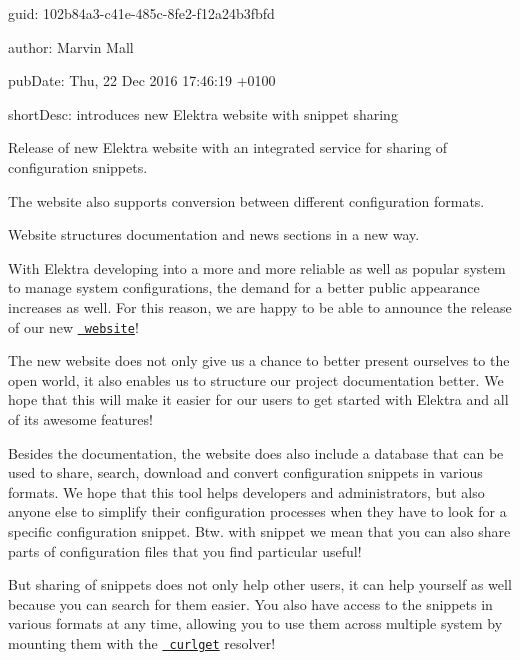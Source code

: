 
\begin{DoxyItemize}
\item guid\+: 102b84a3-\/c41e-\/485c-\/8fe2-\/f12a24b3fbfd
\item author\+: Marvin Mall
\item pub\+Date\+: Thu, 22 Dec 2016 17\+:46\+:19 +0100
\item short\+Desc\+: introduces new Elektra website with snippet sharing
\end{DoxyItemize}


\begin{DoxyEnumerate}
\item Release of new Elektra website with an integrated service for sharing of configuration snippets.
\item The website also supports conversion between different configuration formats.
\item Website structures documentation and news sections in a new way.
\end{DoxyEnumerate}

With Elektra developing into a more and more reliable as well as popular system to manage system configurations, the demand for a better public appearance increases as well. For this reason, we are happy to be able to announce the release of our new \href{https://www.libelektra.org}{\texttt{ website}}!

The new website does not only give us a chance to better present ourselves to the open world, it also enables us to structure our project documentation better. We hope that this will make it easier for our users to get started with Elektra and all of its awesome features!

Besides the documentation, the website does also include a database that can be used to share, search, download and convert configuration snippets in various formats. We hope that this tool helps developers and administrators, but also anyone else to simplify their configuration processes when they have to look for a specific configuration snippet. Btw. with snippet we mean that you can also share parts of configuration files that you find particular useful!

But sharing of snippets does not only help other users, it can help yourself as well because you can search for them easier. You also have access to the snippets in various formats at any time, allowing you to use them across multiple system by mounting them with the \href{https://master.libelektra.org/src/plugins/curlget}{\texttt{ curlget}} resolver!

